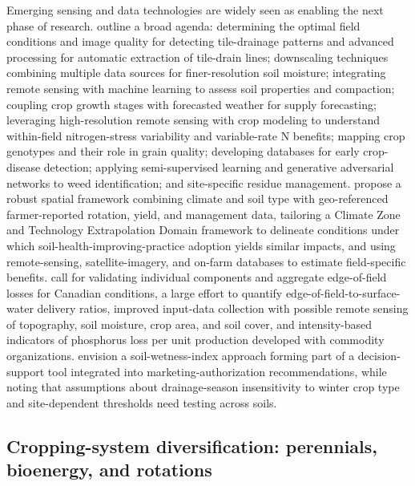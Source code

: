 \documentclass[11pt]{article}
\begin{document}
Emerging sensing and data technologies are widely seen as enabling the next phase of research. \textcite{Khanal2020} outline a broad agenda: determining the optimal field conditions and image quality for detecting tile-drainage patterns and advanced processing for automatic extraction of tile-drain lines; downscaling techniques combining multiple data sources for finer-resolution soil moisture; integrating remote sensing with machine learning to assess soil properties and compaction; coupling crop growth stages with forecasted weather for supply forecasting; leveraging high-resolution remote sensing with crop modeling to understand within-field nitrogen-stress variability and variable-rate N benefits; mapping crop genotypes and their role in grain quality; developing databases for early crop-disease detection; applying semi-supervised learning and generative adversarial networks to weed identification; and site-specific residue management. \textcite{Cassman2025} propose a robust spatial framework combining climate and soil type with geo-referenced farmer-reported rotation, yield, and management data, tailoring a Climate Zone and Technology Extrapolation Domain framework to delineate conditions under which soil-health-improving-practice adoption yields similar impacts, and using remote-sensing, satellite-imagery, and on-farm databases to estimate field-specific benefits. \textcite{Reid2018} call for validating individual components and aggregate edge-of-field losses for Canadian conditions, a large effort to quantify edge-of-field-to-surface-water delivery ratios, improved input-data collection with possible remote sensing of topography, soil moisture, crop area, and soil cover, and intensity-based indicators of phosphorus loss per unit production developed with commodity organizations. \textcite{Julien2023} envision a soil-wetness-index approach forming part of a decision-support tool integrated into marketing-authorization recommendations, while noting that assumptions about drainage-season insensitivity to winter crop type and site-dependent thresholds need testing across soils.

\subsection{Cropping-system diversification: perennials, bioenergy, and rotations}
\end{document}
